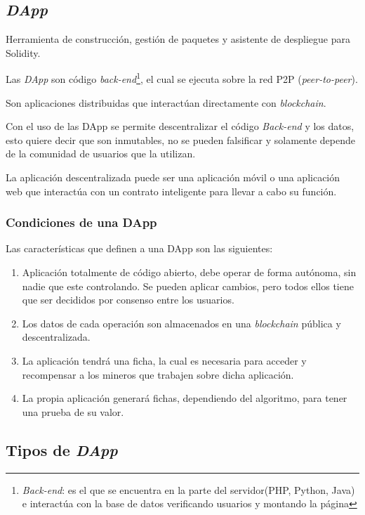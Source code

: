 \subsection{\textit{DApp}}

Herramienta de construcción, gestión de paquetes y asistente de despliegue para Solidity.

Las \textit{DApp}\cite{dapp}\cite{dapp1} son código \textit{back-end}\footnote{\textit{Back-end}: es el que se encuentra en la parte del servidor(PHP, Python, Java) e interactúa con la base de datos verificando usuarios y montando la página}, el cual se ejecuta sobre la red P2P (\textit{peer-to-peer}).

Son aplicaciones distribuidas que interactúan directamente con \textit{blockchain}.

Con el uso de las DApp se permite descentralizar el código \textit{Back-end} y los datos, esto quiere decir que son inmutables, no se pueden falsificar y solamente depende de la comunidad de usuarios que la utilizan. 

La aplicación descentralizada puede ser una aplicación móvil o una aplicación web que interactúa con un contrato inteligente para llevar a cabo su función.

\subsubsection{Condiciones de una DApp}

Las características que definen a una DApp son las siguientes:

\begin{enumerate}
	\item Aplicación totalmente de código abierto, debe operar de forma autónoma, sin nadie que este controlando. Se pueden aplicar cambios, pero todos ellos tiene que ser decididos por consenso entre los usuarios.
	\item Los datos de cada operación son almacenados en una \textit{blockchain} pública y descentralizada.
	\item La aplicación tendrá una ficha, la cual es necesaria para acceder y recompensar a los mineros que trabajen sobre dicha aplicación.
	\item La propia aplicación generará fichas, dependiendo del algoritmo, para tener una prueba de su valor.
	 
\end{enumerate}

\subsection{Tipos de \textit{DApp}}

